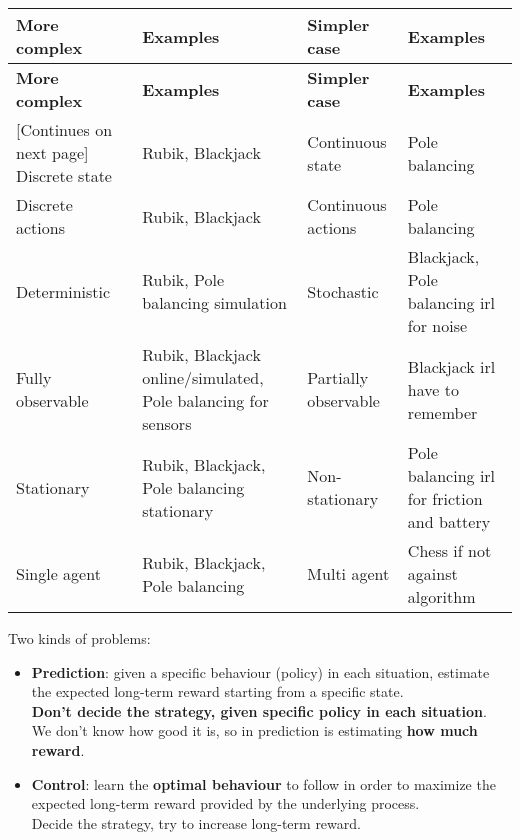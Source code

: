     \begin{tabularx}{\linewidth}{X|X|X|X}
        \toprule
        \textbf{More complex} & \textbf{Examples} & \textbf{Simpler case} & \textbf{Examples} \\
        \midrule
        \endfirsthead
        \toprule
        \textbf{More complex} & \textbf{Examples} & \textbf{Simpler case} & \textbf{Examples} \\
        \midrule
        \endhead
        \midrule
        \footnotesize [Continues on next page]
        \endfoot
        \bottomrule
        \endlastfoot
            Discrete state & Rubik, Blackjack & Continuous state & Pole balancing\\ \midrule
            Discrete actions & Rubik, Blackjack & Continuous actions & Pole balancing\\ \midrule
            Deterministic & Rubik, Pole balancing simulation & Stochastic & Blackjack, Pole balancing irl for noise\\ \midrule
            Fully observable & Rubik, Blackjack online/simulated, Pole balancing for sensors &  Partially observable & Blackjack irl have to remember\\ \midrule
            Stationary & Rubik, Blackjack, Pole balancing stationary &  Non-stationary & Pole balancing irl for friction and battery\\ \midrule
            Single agent & Rubik, Blackjack, Pole balancing &  Multi agent & Chess if not against algorithm
    \end{tabularx}
    Two kinds of problems:
    \begin{itemize}
        \item \textbf{Prediction}: given a specific behaviour (policy) in each situation, estimate the expected long-term reward starting from a specific state.\\
        \textbf{Don't decide the strategy, given specific policy in each situation}.\\
        We don't know how good it is, so in prediction is estimating \textbf{how much reward}.
        \item \textbf{Control}: learn the \textbf{optimal behaviour} to follow in order to maximize the expected long-term reward provided by the underlying process.\\
        Decide the strategy, try to increase long-term reward.
    \end{itemize}
